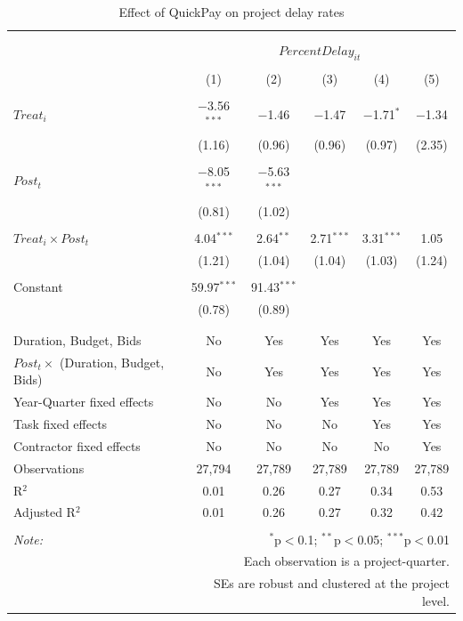 \documentclass[
]{article}
\begin{document}
\begin{table}[H] \centering 
  \caption{Effect of QuickPay on project delay rates} 
  \label{} 
\small 
\begin{tabular}{@{\extracolsep{-2pt}}lccccc} 
\\[-1.8ex]\hline 
\hline \\[-1.8ex] 
\\[-1.8ex] & \multicolumn{5}{c}{$PercentDelay_{it}$} \\ 
\\[-1.8ex] & (1) & (2) & (3) & (4) & (5)\\ 
\hline \\[-1.8ex] 
 $Treat_i$ & $-$3.56$^{***}$ & $-$1.46 & $-$1.47 & $-$1.71$^{*}$ & $-$1.34 \\ 
  & (1.16) & (0.96) & (0.96) & (0.97) & (2.35) \\ 
  & & & & & \\ 
 $Post_t$ & $-$8.05$^{***}$ & $-$5.63$^{***}$ &  &  &  \\ 
  & (0.81) & (1.02) &  &  &  \\ 
  & & & & & \\ 
 $Treat_i \times Post_t$ & 4.04$^{***}$ & 2.64$^{**}$ & 2.71$^{***}$ & 3.31$^{***}$ & 1.05 \\ 
  & (1.21) & (1.04) & (1.04) & (1.03) & (1.24) \\ 
  & & & & & \\ 
 Constant & 59.97$^{***}$ & 91.43$^{***}$ &  &  &  \\ 
  & (0.78) & (0.89) &  &  &  \\ 
  & & & & & \\ 
\hline \\[-1.8ex] 
Duration, Budget, Bids & No & Yes & Yes & Yes & Yes \\ 
$Post_t \times$  (Duration, Budget, Bids) & No & Yes & Yes & Yes & Yes \\ 
Year-Quarter fixed effects & No & No & Yes & Yes & Yes \\ 
Task fixed effects & No & No & No & Yes & Yes \\ 
Contractor fixed effects & No & No & No & No & Yes \\ 
Observations & 27,794 & 27,789 & 27,789 & 27,789 & 27,789 \\ 
R$^{2}$ & 0.01 & 0.26 & 0.27 & 0.34 & 0.53 \\ 
Adjusted R$^{2}$ & 0.01 & 0.26 & 0.27 & 0.32 & 0.42 \\ 
\hline 
\hline \\[-1.8ex] 
\textit{Note:}  & \multicolumn{5}{r}{$^{*}$p$<$0.1; $^{**}$p$<$0.05; $^{***}$p$<$0.01} \\ 
 & \multicolumn{5}{r}{Each observation is a project-quarter.} \\ 
 & \multicolumn{5}{r}{SEs are robust and clustered at the project level.} \\ 
\end{tabular} 
\end{table}
\end{document}
